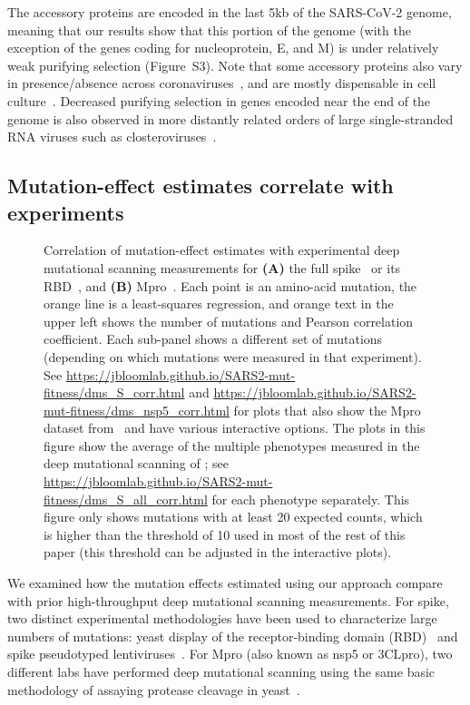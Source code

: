 \documentclass[9pt,twocolumn,twoside]{gsajnl_modified}
\begin{document}
The accessory proteins are encoded in the last 5kb of the SARS-CoV-2 genome, meaning that our results show that this portion of the genome (with the exception of the genes coding for nucleoprotein, E, and M) is under relatively weak purifying selection (Figure~S3).
Note that some accessory proteins also vary in presence/absence across coronaviruses~\citep{v2021coronavirus,llanes2020betacoronavirus}, and are mostly dispensable in cell culture~\citep{mcgrath2022sars,silvas2021contribution,liu2022live,liu2014accessory}.
Decreased purifying selection in genes encoded near the end of the genome is also observed in more distantly related orders of large single-stranded RNA viruses such as closteroviruses~\citep{wang2011genetic, dawson2013virus}.

\subsection*{Mutation-effect estimates correlate with experiments}

\begin{figure*}
\centering
\caption{
Correlation of mutation-effect estimates with experimental deep mutational scanning measurements for {\bf (A)} the full spike~\citep{dadonaite2023pseudovirus} or its RBD~\citep{starr2022deep}, and {\bf (B)} Mpro~\citep{flynn2023,iketani2022functional}.
Each point is an amino-acid mutation, the orange line is a least-squares regression, and orange text in the upper left shows the number of mutations and Pearson correlation coefficient.
Each sub-panel shows a different set of mutations (depending on which mutations were measured in that experiment).
See \url{https://jbloomlab.github.io/SARS2-mut-fitness/dms_S_corr.html} and \url{https://jbloomlab.github.io/SARS2-mut-fitness/dms_nsp5_corr.html} for plots that also show the Mpro dataset from~\citep{flynn2022} and have various interactive options.
The plots in this figure show the average of the multiple phenotypes measured in the deep mutational scanning of \cite{starr2022deep}; see \url{https://jbloomlab.github.io/SARS2-mut-fitness/dms_S_all_corr.html} for each phenotype separately.
This figure only shows mutations with at least 20 expected counts, which is higher than the threshold of 10 used in most of the rest of this paper (this threshold can be adjusted in the interactive plots).
\label{fig:dms}
}
\end{figure*}

We examined how the mutation effects estimated using our approach compare with prior high-throughput deep mutational scanning measurements.
For spike, two distinct experimental methodologies have been used to characterize large numbers of mutations: yeast display of the receptor-binding domain (RBD)~\citep{starr2020deep,starr2022deep} and spike pseudotyped lentiviruses~\citep{dadonaite2023pseudovirus}.
For Mpro (also known as nsp5 or 3CLpro), two different labs have performed deep mutational scanning using the same basic methodology of assaying protease cleavage in yeast~\citep{flynn2022,flynn2023,iketani2022functional}.
\end{document}
